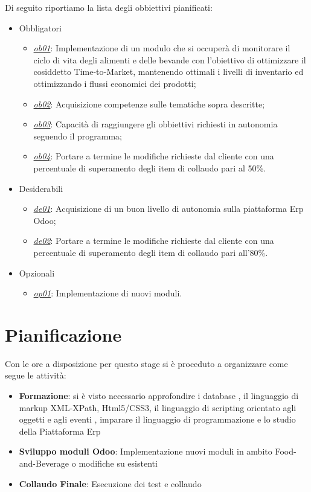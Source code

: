 Di seguito riportiamo la lista degli obbiettivi pianificati:
\begin{itemize}
	\item Obbligatori
	      \begin{itemize}
	      	\item \underline{\textit{ob01}}: Implementazione di un modulo che si occuperà di monitorare il ciclo di vita degli alimenti e delle bevande con l’obiettivo di ottimizzare il cosiddetto Time-to-Market, mantenendo ottimali i livelli di inventario ed ottimizzando i flussi economici dei prodotti;
	      	\item \underline{\textit{ob02}}: Acquisizione competenze sulle tematiche sopra descritte;
	      	\item \underline{\textit{ob03}}: Capacità di raggiungere gli obbiettivi richiesti in autonomia seguendo il programma;
	      	\item \underline{\textit{ob04}}: Portare a termine le modifiche richieste dal cliente con una percentuale di superamento degli item di collaudo pari al 50\%.
	      \end{itemize}
	\item Desiderabili
	      \begin{itemize}
	      	\item \underline{\textit{de01}}: Acquisizione di un buon livello di autonomia sulla piattaforma Erp Odoo;
	      	\item \underline{\textit{de02}}: Portare a termine le modifiche richieste dal cliente con una percentuale di superamento degli item di collaudo pari all’80\%.
	    
	      \end{itemize}
	\item Opzionali
	      \begin{itemize}
	      	\item \underline{\textit{op01}}: Implementazione di nuovi moduli.
	      \end{itemize} 
\end{itemize}

\section{Pianificazione}
Con le ore a disposizione per questo stage si è proceduto a organizzare come segue le attività:
\begin{itemize}
	\item \textbf{Formazione}: si è visto necessario approfondire i database , il linguaggio di markup XML-XPath, Html5/CSS3, il linguaggio di scripting orientato agli oggetti e agli eventi , imparare il linguaggio di programmazione  e lo studio della Piattaforma Erp 
	\item \textbf{Sviluppo moduli Odoo}: Implementazione nuovi moduli in ambito Food-and-Beverage o modifiche su esistenti
	\item \textbf{Collaudo Finale}: Esecuzione dei test e collaudo
\end{itemize}

